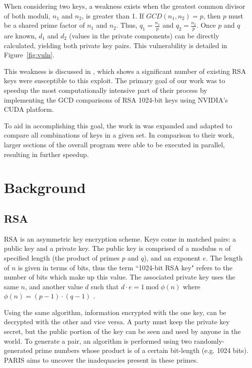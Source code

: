 \documentclass[12pt]{ucthesis}
\begin{document}
When considering two keys, a weakness exists when the greatest common 
divisor of both moduli, $n_1$ and $n_2$, is greater than 1. If $GCD(n_1, 
n_2) = p$, then $p$ must be a shared prime factor of $n_1$ and $n_2$. Thus, 
$q_1 = \frac{n_1}{p}$ and $q_2 = \frac{n_2}{p}$. Once $p$ and $q$ are known,
$d_1$ and $d_2$ (values in the private components) can be directly calculated,
yielding both private key pairs. This vulnerability is detailed in
Figure~\ref{fig:vuln}.

This weakness is discussed in \cite{lenstra2012ron}, which shows a significant
number of existing RSA keys were susceptible to this exploit. The primary goal
of our work was to speedup the most computationally intensive part of their
process by implementing the GCD comparisons of RSA 1024-bit keys using NVIDIA's
CUDA platform.

To aid in accomplishing this goal, the work in \cite{fujimoto2009high} was 
expanded and adapted to compare all combinations of keys in a given set. In 
comparison to their work, larger sections of the overall program were able to 
be executed in parallel, resulting in further speedup.


\chapter{Background}
\label{sec:background}

\section{RSA}
\label{subsec:rsa}
RSA is an asymmetric key encryption scheme. Keys come in matched pairs: a
public key and a private key. The public key is comprised of a modulus $n$ of
specified length (the product of primes $p$ and $q$), and an exponent $e$. The
length of $n$ is given in terms of bits, thus the term ``1024-bit RSA key"
refers to the number of bits which make up this value. The associated private
key uses the same $n$, and another value $d$ such that $d \cdot e = 1
\:\text{mod} \;\phi(n)$ where $\phi(n) = (p - 1) \cdot (q - 1)$
\citep{rivest1978method}.

Using the same algorithm, information encrypted with the one key, can be
decrypted with the other and vice versa. A party must keep the private key
secret, but the public portion of the key can be seen and used by anyone in the
world. To generate a pair, an algorithm is performed using two
randomly-generated prime numbers whose product is of a certain bit-length (e.g.
1024 bits). PARIS aims to uncover the inadequacies present in these primes.
\end{document}
